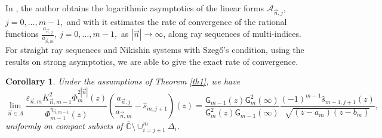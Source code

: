 \documentclass{amsart}
\numberwithin{equation}{section}
\newtheorem{corollary}[theorem]{Corollary}
\theoremstyle{definition}
\newcommand{\CC}{\mathbb{C}}      %
\newcommand{\n}{\vec{n}}          %
\begin{document}
In \cite{lysov20}, the author obtains the logarithmic asymptotics of the linear forms $\mathcal{A}_{\n,j}$, $j=0,\ldots,m-1,$ and with it  estimates the rate of convergence of the  rational functions $\frac{a_{\n,j}}{a_{\n,m}}$, $j=0,\ldots,m-1,$ as $|\n| \to \infty$, along ray sequences of multi-indices. For straight ray sequences and Nikishin systems with Szeg\H{o}'s condition, using the results on strong asymptotics, we are able to give the exact rate of convergence.

\begin{corollary}
	\label{convaprox}
	Under the assumptions of Theorem \ref{th1}, we have
\begin{equation}
	\label{rate3}
	\lim_{\n\in\Lambda} \frac{\varepsilon_{\n,m}K_{\n,m-1}^2\Phi_m^{2|\n|}(z)}{\Phi_{m-1}^{\eta_{\n,m-1}}(z)}\left(\frac{a_{\n,j}}{a_{\n,m}}- \widehat{s}_{m,j+1}\right)(z) = \frac{\mathsf{G}_{m-1}(z)\mathsf{G}_m^{2}(\infty)}{\mathsf{G}_m^{2}(z)\mathsf{G}_{m-1}(\infty)}\frac{(-1)^{m-1} \widehat{s}_{m-1,j+1}(z)}{\sqrt{(z-a_m)(z-b_m)}},
\end{equation}
uniformly on compact subsets of $\overline{\CC}\setminus \cup_{i=j+1}^m \Delta_{i}$.
\end{corollary}
\end{document}
